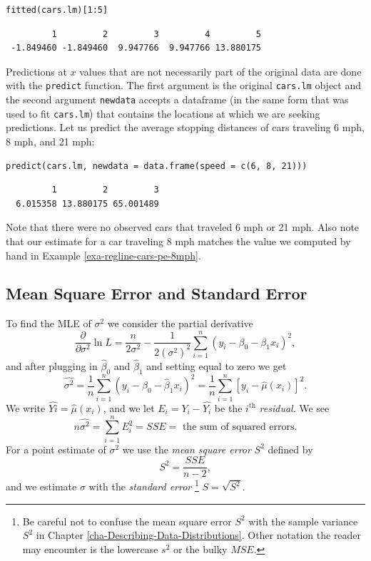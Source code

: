 \documentclass[captions=tableheading]{scrbook}
\begin{document}
\begin{verbatim}
fitted(cars.lm)[1:5]
\end{verbatim}

\begin{verbatim}
         1         2         3         4         5 
 -1.849460 -1.849460  9.947766  9.947766 13.880175
\end{verbatim}

Predictions at \(x\) values that are not necessarily part of the original data are done with the \texttt{predict} function. The first argument is the original \texttt{cars.lm} object and the second argument \texttt{newdata} accepts a dataframe (in the same form that was used to fit \texttt{cars.lm}) that contains the locations at which we are seeking predictions. Let us predict the average stopping distances of cars traveling 6 mph, 8 mph, and 21 mph:


\begin{verbatim}
predict(cars.lm, newdata = data.frame(speed = c(6, 8, 21)))
\end{verbatim}

\begin{verbatim}
         1         2         3 
  6.015358 13.880175 65.001489
\end{verbatim}

Note that there were no observed cars that traveled 6 mph or 21 mph. Also note that our estimate for a car traveling 8 mph matches the value we computed by hand in Example \ref{exa-regline-cars-pe-8mph}.
\subsection{Mean Square Error and Standard Error}
\label{sec-11-2-3}


To find the MLE of \(\sigma^{2}\) we consider the partial derivative
\begin{equation}
\frac{\partial}{\partial\sigma^{2}}\ln L=\frac{n}{2\sigma^{2}}-\frac{1}{2(\sigma^{2})^{2}}\sum_{i=1}^{n}(y_{i}-\beta_{0}-\beta_{1}x_{i})^{2},
\end{equation}
and after plugging in \(\hat{\beta}_{0}\) and \(\hat{\beta}_{1}\) and setting equal to zero we get
\begin{equation}
\hat{\sigma^{2}}=\frac{1}{n}\sum_{i=1}^{n}(y_{i}-\hat{\beta}_{0}-\hat{\beta}_{1}x_{i})^{2}=\frac{1}{n}\sum_{i=1}^{n}[y_{i}-\hat{\mu}(x_{i})]^{2}.
\end{equation}
We write \(\hat{Yi}=\hat{\mu}(x_{i})\), and we let \(E_{i}=Y_{i}-\hat{Y_{i}}\) be the \(i^{\mathrm{th}}\) \emph{residual}. We see 
\begin{equation}
n\hat{\sigma^{2}}=\sum_{i=1}^{n}E_{i}^{2}=SSE=\mbox{ the sum of squared errors.}
\end{equation}
For a point estimate of \(\sigma^{2}\) we use the \emph{mean square error} \(S^{2}\) defined by 
\begin{equation}
S^{2}=\frac{SSE}{n-2},
\end{equation}
and we estimate \(\sigma\) with the \emph{standard error}
\footnote{Be careful not to confuse the mean square error \(S^{2}\) with the sample variance \(S^{2}\) in Chapter \ref{cha-Describing-Data-Distributions}. Other notation the reader may encounter is the lowercase \(s^{2}\) or the bulky \(MSE\).}
\(S=\sqrt{S^{2}}\).
\end{document}
